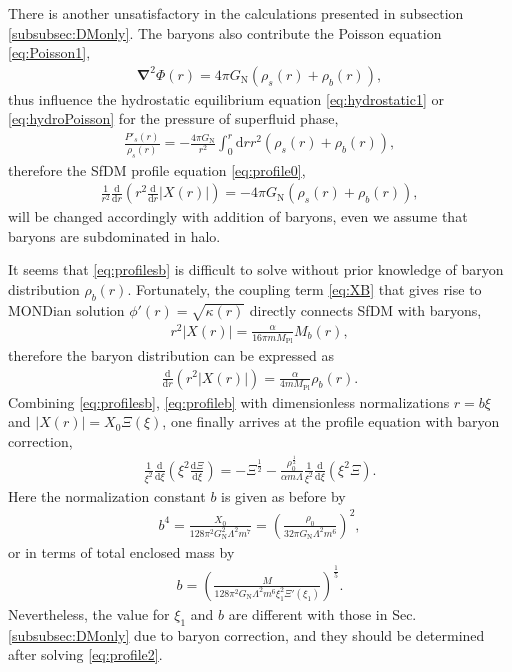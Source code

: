 \documentclass[aps,prd,twocolumn,10pt,groupedaddress]{revtex4-1}
\begin{document}
There is another unsatisfactory in the calculations presented in subsection \ref{subsubsec:DMonly}. The baryons also contribute the Poisson equation \eqref{eq:Poisson1},
\begin{align}\label{eq:Poisson2}
\mathbf{\nabla}^2\Phi(r)=4\pi G_\mathrm{N}(\rho_s(r)+\rho_b(r)),
\end{align}
thus influence the hydrostatic equilibrium equation \eqref{eq:hydrostatic1} or \eqref{eq:hydroPoisson} for the pressure of superfluid phase,
\begin{align}\label{eq:hydrostatic2}
\frac{P'_s(r)}{\rho_s(r)}=-\frac{4\pi G_\mathrm{N}}{r^2}\int_0^r\mathrm{d}r r^2(\rho_s(r)+\rho_b(r)),
\end{align}
therefore the SfDM profile equation \eqref{eq:profile0},
\begin{align}\label{eq:profilesb}
\frac{1}{r^2}\frac{\mathrm{d}}{\mathrm{d}r}\left(r^2\frac{\mathrm{d}}{\mathrm{d}r}|X(r)|\right)=-4\pi G_\mathrm{N}(\rho_s(r)+\rho_b(r)),
\end{align}
will be changed accordingly with addition of baryons, even we assume that baryons are subdominated in halo.

It seems that \eqref{eq:profilesb} is difficult to solve without prior knowledge of baryon distribution $\rho_b(r)$. Fortunately, the coupling term \eqref{eq:XB} that gives rise to MONDian solution $\phi'(r)=\sqrt{\kappa(r)}$ directly connects SfDM with baryons,
\begin{align}
r^2|X(r)|=\frac{\alpha}{16\pi mM_\mathrm{Pl}}M_b(r),
\end{align}
therefore the baryon distribution can be expressed as
\begin{align}\label{eq:profileb}
\frac{\mathrm{d}}{\mathrm{d}r}\left(r^2|X(r)|\right)=\frac{\alpha}{4mM_\mathrm{Pl}}\rho_b(r).
\end{align}
Combining \eqref{eq:profilesb}, \eqref{eq:profileb} with dimensionless normalizations $r=b\xi$ and $|X(r)|=X_0\Xi(\xi)$, one finally arrives at the profile equation with baryon correction,
\begin{align}\label{eq:profile2}
\frac{1}{\xi^2}\frac{\mathrm{d}}{\mathrm{d}\xi}\left(\xi^2\frac{\mathrm{d}\Xi}{\mathrm{d}\xi}\right)=-\Xi^\frac12-\frac{\rho_0^\frac12}{\alpha m\Lambda}\frac{1}{\xi^2}\frac{\mathrm{d}}{\mathrm{d}\xi}\left(\xi^2\Xi\right).
\end{align}
Here the normalization constant $b$ is given as before by
\begin{align}
b^4=\frac{X_0}{128\pi^2G_\mathrm{N}^2\Lambda^2m^7}=\left(\frac{\rho_0}{32\pi G_\mathrm{N}\Lambda^2m^6}\right)^2,
\end{align}
or in terms of total enclosed mass by
\begin{align}
b=\left(\frac{M}{128\pi^2G_\mathrm{N}\Lambda^2m^6\xi_1^2\Xi'(\xi_1)}\right)^\frac15.
\end{align}
Nevertheless, the value for $\xi_1$ and $b$ are different with those in Sec. \ref{subsubsec:DMonly} due to baryon correction, and they should be determined after solving \eqref{eq:profile2}.
\end{document}
